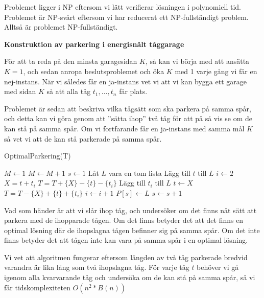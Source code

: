\documentclass[11pt]{exam}
\begin{document}
\begin{questions}
Problemet ligger i NP eftersom vi lätt verifierar lösningen i polynomiell tid. Problemet är NP-svårt eftersom vi har reducerat ett NP-fullständigt problem. Alltså är problemet NP-fullständigt.

\newpage
\question \textbf{Konstruktion av parkering i energisnålt tåggarage}

För att ta reda på den minsta garagesidan $K$, så kan vi börja med att ansätta $K = 1$, och sedan anropa beslutsproblemet och öka $K$ med 1 varje gång vi får en nej-instans. När vi således får en ja-instans vet vi att vi kan bygga ett garage med sidan $K$ så att alla tåg $t_1, ..., t_n$ får plats.

		
Problemet är sedan att beskriva vilka tågsätt som ska parkera på samma spår, och detta kan vi göra genom att ''sätta ihop'' två tåg för att på så vis se om de kan stå på samma spår. Om vi fortfarande får en ja-instans med samma mål $K$ så vet vi att de kan stå parkerade på samma spår.

\begin{algorithm}
	\caption{OptimalParkering(T)}
	\begin{algorithmic}
		\STATE $M \leftarrow 1$
			\STATE $M \leftarrow M + 1$
		\ENDWHILE
		\STATE $s \leftarrow 1$ 
			\STATE Låt $L$ vara en tom lista
			\STATE Lägg till $t$ till $L$
			\STATE $i \leftarrow 2$
				\STATE $X = t + t_i$ 
				\STATE $T = T + \{X\} - \{t\} - \{t_i\}$ 
					\STATE Lägg till $t_i$ till $L$
					\STATE $t \leftarrow X$ 
				\ELSE
					\STATE $T = T - \{X\} + \{t\} + \{t_i\}$ 
				\ENDIF
				\STATE $i \leftarrow i+1$
			\ENDWHILE
			\STATE $P[s] \leftarrow L$ 
			\STATE $s \leftarrow s + 1$ 
		\ENDFOR
	\end{algorithmic}
\end{algorithm}

Vad som händer är att vi slår ihop tåg, och undersöker om det finns nåt sätt att parkera med de ihopparade tågen. Om det finns betyder det att det finns en optimal lösning där de ihopslagna tågen befinner sig på samma spår. Om det inte finns betyder det att tågen inte kan vara på samma spår i en optimal lösning. 

Vi vet att algoritmen fungerar eftersom längden av två tåg parkerade bredvid varandra är lika lång som två ihopslagna tåg. 
För varje tåg $t$ behöver vi gå igenom alla kvarvarande tåg och undersöka om de kan stå på samma spår, så vi får tidskomplexiteten $O(n^2 * B(n))$

\end{questions}
\end{document}
